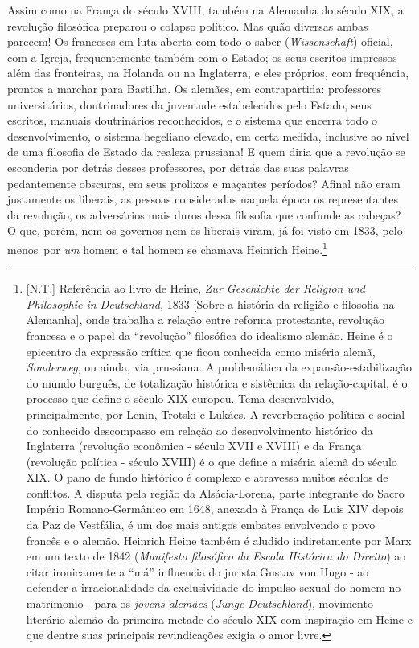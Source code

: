 Assim como na França do século XVIII, também na Alemanha do século XIX,
a revolução filosófica preparou o colapso político. Mas quão diversas
ambas parecem! Os franceses em luta aberta com todo o saber
(\emph{Wissenschaft}) oficial, com a Igreja, frequentemente também com o
Estado; os seus escritos impressos além das fronteiras, na Holanda ou na
Inglaterra, e eles próprios, com frequência, prontos a marchar para
Bastilha. Os alemães, em contrapartida: professores universitários,
doutrinadores da juventude estabelecidos pelo Estado, seus escritos,
manuais doutrinários reconhecidos, e o sistema que encerra todo o
desenvolvimento, o sistema hegeliano elevado, em certa medida, inclusive
ao nível de uma filosofia de Estado da realeza prussiana! E quem diria
que a revolução se esconderia por detrás desses professores, por detrás
das suas palavras pedantemente obscuras, em seus prolixos e maçantes
períodos? Afinal não eram justamente os liberais, as pessoas
consideradas naquela época os representantes da revolução, os
adversários mais duros dessa filosofia que confunde as cabeças? O que,
porém, nem os governos nem os liberais viram, já foi visto em 1833, pelo
menos~por \emph{um} homem e tal homem se
chamava Heinrich
Heine.\footnote{{[}N.T.{]} Referência ao livro de Heine, \emph{Zur
  Geschichte der Religion und Philosophie in Deutschland,} 1833 {[}Sobre
  a história da religião e filosofia na Alemanha{]}, onde trabalha a
  relação entre reforma protestante, revolução francesa e o papel da
  ``revolução'' filosófica do idealismo alemão. Heine é o epicentro da
  expressão crítica que ficou conhecida como miséria alemã,
  \emph{Sonderweg}, ou ainda, via prussiana. A problemática da
  expansão-estabilização do mundo burguês, de totalização histórica e
  sistêmica da relação-capital, é o processo que define o século XIX
  europeu. Tema desenvolvido, principalmente, por Lenin, Trotski e
  Lukács. A reverberação política e social do conhecido descompasso em
  relação ao desenvolvimento histórico da Inglaterra (revolução
  econômica - século XVII e XVIII) e da França (revolução política -
  século XVIII) é o que define a miséria alemã do século XIX. O pano de
  fundo histórico é complexo e atravessa muitos séculos de conflitos. A
  disputa pela região da Alsácia-Lorena, parte integrante do Sacro
  Império Romano-Germânico em 1648, anexada à França de Luis XIV depois
  da Paz de Vestfália, é um dos mais antigos embates envolvendo o povo
  francês e o alemão. Heinrich Heine também é aludido indiretamente por
  Marx em um texto de 1842 (\emph{Manifesto filosófico da Escola
  Histórica do Direito}) ao citar ironicamente a ``má'' influencia do
  jurista Gustav von Hugo - ao defender a irracionalidade da
  exclusividade do impulso sexual do homem no matrimonio - para os
  \emph{jovens alemães} (\emph{Junge Deutschland}), movimento literário
  alemão da primeira metade do século XIX com inspiração em Heine e que
  dentre suas principais revindicações exigia o amor livre.}

